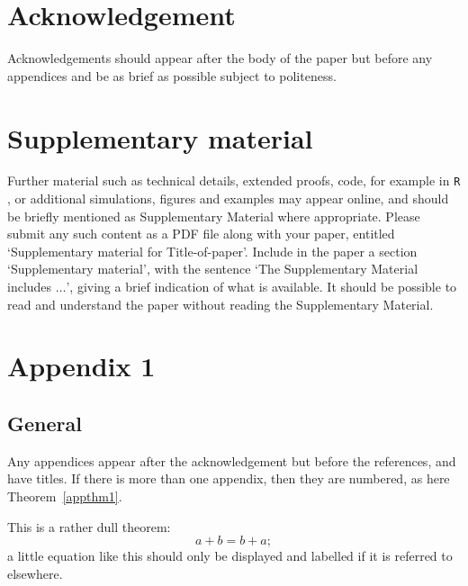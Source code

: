 \documentclass[lineno]{biometrika}
\begin{document}
\section*{Acknowledgement}
Acknowledgements should appear after the body of the paper but before any appendices and be as brief as possible
subject to politeness. 

\section*{Supplementary material}
\label{SM}
Further material such as technical details, extended proofs, code, for example in \texttt{R} \citep{R:2025}, or additional  simulations, figures and examples may appear online, and should be briefly mentioned as Supplementary Material where appropriate.  Please submit any such content as a PDF file along with your paper, entitled `Supplementary material for Title-of-paper'.
Include in the paper a section `Supplementary material',  with the sentence `The Supplementary Material includes $\ldots$', giving a brief indication of what is available. It should be possible to read and understand the paper without reading the Supplementary Material.




\appendix

\appendixone
\section*{Appendix 1}
\subsection*{General}

Any appendices appear after the acknowledgement but before the references, and have titles. If there is more than one appendix, then they are numbered,  as here Theorem~\ref{appthm1}.

\begin{theorem}\label{appthm1}
This is a rather dull theorem:
\begin{equation}
\label{A1}
a + b = b + a;
\end{equation}
a little equation like this should only be displayed and labelled if it is referred to  elsewhere. 
\end{theorem}
\end{document}
